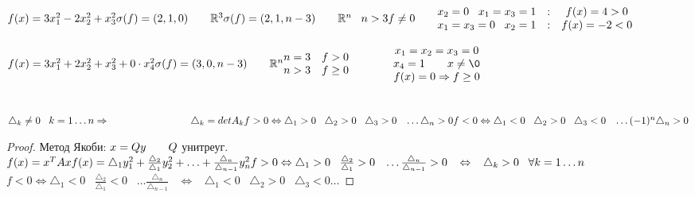 \documentclass[../main.tex]{subfiles}
\begin{document}
	\begin{examples}
		\begin{mylist}\
			\item $f(x) = 3x_1^2 - 2x_2^2 + x_3^2 \n 
			\sigma(f) = (2, 1, 0) \Space \R^3 \n 
			\sigma(f) = (2, 1, n-3) \Space \R^n \; \; \; n > 3 \n 
			f \neq 0\Space  \begin{matrix}
				x_2 = 0 \; \; \; x_1 = x_3 = 1&:& f(x) = 4 > 0 \\
				x_1 = x_3 = 0 \; \; \; x_2 = 1&:& f(x) = -2 < 0
			\end{matrix}$\ \\
			\item $f(x) = 3x_1^2 + 2x_2^2 + x_3^2 + 0 \cdot x_4^2\n 
			\sigma(f) = (3, 0, n-3) \Space \R^n \n 
			\begin{matrix}
				n = 3 & f > 0\\
				n > 3 & f \geq 0
			\end{matrix} \Sspace \begin{matrix}
				x_1 = x_2 = x_3 = 0 \\
				x_4 = 1 \Space x \neq \0 \\ 
				f(x) = 0 \Rightarrow f \geq 0
			\end{matrix}$
		\end{mylist}
	\end{examples}
	\begin{theorem}\ \\
		$\triangle_k \neq 0 \; \; \; k = 1 \ldots n \Rightarrow  \Sspace \Sspace \triangle_k = det A_k\n 
		f> 0 \Leftrightarrow \triangle_1 > 0 \; \; \; \triangle_2 > 0 \; \; \; \triangle_3 > 0 \; \; \; \ldots \triangle_n > 0 \n 
		f<0 \Leftrightarrow \triangle_1 < 0 \; \; \; \triangle_2 > 0 \; \; \; \triangle_3 < 0 \; \; \; \ldots (-1)^n \triangle_n > 0$
	\end{theorem}
	\begin{proof}
		Метод Якоби: $x = Q y \Space Q$ унитреуг. \Space $f(x) = x^T A x \n 
		f(x) = \triangle_1 y_1^2 + \frac{\triangle_2}{\triangle_1} y_2^2 + \ldots
		 + \frac{\triangle_n}{\triangle_{n-1}} y_n^2\n 
		 f>0 \Leftrightarrow \triangle_1 > 0 \; \; \; \frac{\triangle_2}{\triangle_1} > 0 \; \; \; \ldots
		  \frac{\triangle_n}{\triangle_{n-1}} > 0\; \; \;  \Leftrightarrow \; \; \; \triangle_k > 0 \; \; \; \forall k = 1 \ldots n$\n 
		  $f < 0 \Leftrightarrow \triangle_1 < 0 \; \; \; \frac{ \triangle_2}{\triangle_1} < 0 \; \; \; \ldots
		   \frac{\triangle_n}{\triangle_{n-1}} \; \; \; \Leftrightarrow \; \; \; \triangle_1 < 0 \; \; \; \triangle_2 > 0 \; \; \; \triangle_3 < 0 \ldots$
	\end{proof}
\end{document}
